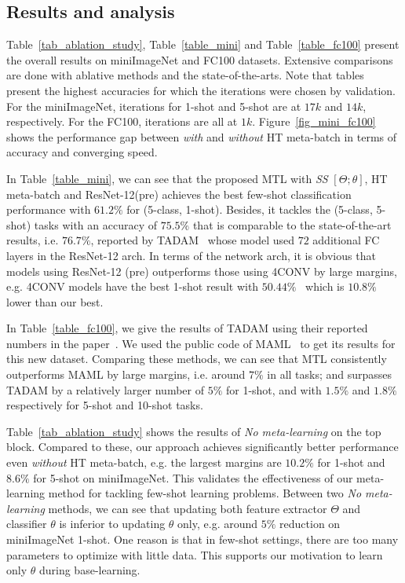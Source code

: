 
\subsection{Results and analysis}
\label{sec_result}






Table~\ref{tab_ablation_study}, Table~\ref{table_mini} and Table~\ref{table_fc100} present the overall results on miniImageNet and FC100 datasets. 
Extensive comparisons are done with ablative methods and the state-of-the-arts. 
Note that tables present the highest accuracies for which the iterations were chosen
by validation. For the miniImageNet, iterations for 1-shot and 5-shot are at $17k$ and $14k$, respectively. For the FC100, iterations are all at $1k$.
%
Figure~\ref{fig_mini_fc100} shows the performance gap between \emph{with} and \emph{without} HT meta-batch in terms of accuracy and converging speed.


%
In Table~\ref{table_mini}, we can see that the proposed MTL with \emph{SS} $[\Theta; \theta]$, HT meta-batch and ResNet-12(pre) achieves the best few-shot classification performance with $61.2\%$ for (5-class, 1-shot). Besides, it tackles the (5-class, 5-shot) tasks with an accuracy of $75.5\%$ that is comparable to the state-of-the-art results, i.e. $76.7\%$, reported by TADAM~\cite{OreshkinNIPS18} whose model used $72$ additional FC layers in the ResNet-12 arch.
%
In terms of the network arch, it is obvious that
models using ResNet-12 (pre) outperforms those using 4CONV by large margins, e.g. 4CONV models have the best 1-shot result with $50.44\%$~\cite{SungCVPR2018} which is $10.8\%$ lower than our best.

%
In Table~\ref{table_fc100}, we give the results of TADAM using their reported numbers in the paper~\cite{OreshkinNIPS18}. 
%
We used the public code of MAML~\cite{FinnAL17} to get its results for this new dataset. 
%
Comparing these methods, we can see that MTL consistently outperforms MAML by large margins, i.e. around $7\%$ in all tasks; and surpasses TADAM by a relatively larger number of $5\%$ for 1-shot, and with $1.5\%$ and $1.8\%$ respectively for 5-shot and 10-shot tasks. 

%
Table~\ref{tab_ablation_study} shows the results of \emph{No meta-learning} on the top block.
Compared to these, our approach achieves significantly better performance even \emph{without} HT meta-batch,
e.g. the largest margins are $10.2\%$ for 1-shot and $8.6\%$ for 5-shot on miniImageNet.
%
This validates the effectiveness of our meta-learning method for tackling few-shot learning problems.
%
Between two \emph{No meta-learning} methods, we can see that updating both feature extractor $\Theta$ and classifier $\theta$ is inferior to updating $\theta$ only, e.g. around $5\%$ reduction on miniImageNet 1-shot.
One reason is that in few-shot settings, there are too many parameters to optimize with little data.
This supports our motivation to learn only $\theta$ during base-learning.

